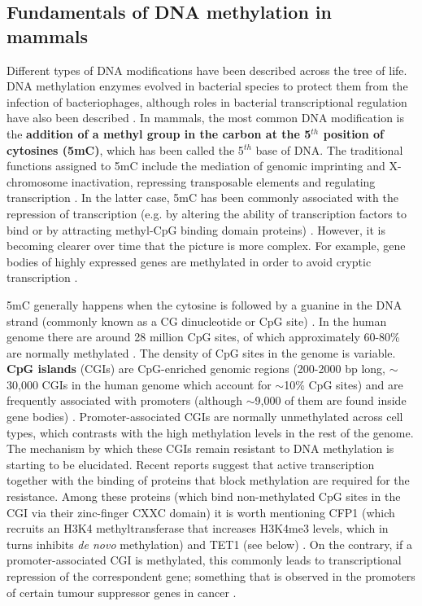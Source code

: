 \smallskip

\subsection{Fundamentals of DNA methylation in mammals} \label{s:1.2.2}

\smallskip

Different types of DNA modifications have been described across the tree of life. DNA methylation enzymes evolved in bacterial species to protect them from the infection of bacteriophages, although roles in bacterial transcriptional regulation have also been described  \cite{Sanchez-Romero2015}. In mammals, the most common DNA modification is the \textbf{addition of a methyl group in the carbon at the 5$^{th}$ position of cytosines (\acrshort{5mC})}, which has been called the 5$^{th}$ base of DNA. The traditional functions assigned to 5mC include the mediation of genomic imprinting and X-chromosome inactivation, repressing transposable elements and regulating transcription \cite{Wu2017}. In the latter case, 5mC has been commonly associated with the repression of transcription (e.g. by altering the ability of transcription factors to bind or by attracting methyl-CpG binding domain proteins) \cite{Li2014}. However, it is becoming clearer over time that the picture is more complex. For example, gene bodies of highly expressed genes are methylated in order to avoid cryptic transcription \cite{Neri2017}.

\bigskip

5mC generally happens when the cytosine is followed by a guanine in the DNA strand (commonly known as a CG dinucleotide or CpG site) \cite{Li2014,Smith2013}. In the human genome there are around 28 million CpG sites, of which approximately 60-80\% are normally methylated \cite{Smith2013}. The density of CpG sites in the genome is variable. \textbf{CpG islands} (\acrshort{CGI}s) are CpG-enriched genomic regions (200-2000 bp long, $\sim$30,000 CGIs in the human genome which account for $\sim$10\% CpG sites) and are frequently associated with promoters (although $\sim$9,000 of them are found inside gene bodies) \cite{Smith2013,Jeziorska2017,Zeng2014}. Promoter-associated CGIs are normally unmethylated across cell types, which contrasts with the high methylation levels in the rest of the genome. The mechanism by which these CGIs remain resistant to DNA methylation is starting to be elucidated. Recent reports suggest that active transcription together with the binding of proteins that block methylation are required for the resistance. Among these proteins (which bind non-methylated CpG sites in the CGI via their zinc-finger CXXC domain) it is worth mentioning CFP1 (which recruits an H3K4 methyltransferase that increases H3K4me3 levels, which in turns inhibits \textit{de novo} methylation) and TET1 (see below) \cite{Takahashi2017}. On the contrary, if a promoter-associated CGI is methylated, this commonly leads to transcriptional repression of the correspondent gene; something that is observed in the promoters of certain tumour suppressor genes in cancer \cite{Flavahan2017}. 

